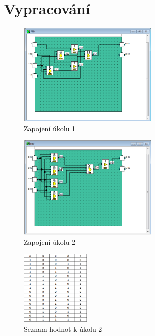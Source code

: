 \documentclass[a4paper]{article}
\begin{document}




\section*{Vypracování}
\begin{figure}[H]
	\centering
	\includegraphics[width=0.6\textwidth]{PLC_1.png}
	\caption{Zapojení úkolu 1}
	\label{fig:mesh1}
\end{figure}

\begin{figure}[H]
	\centering
	\includegraphics[width=0.6\textwidth]{PLC_2.png}
	\caption{Zapojení úkolu 2}
	\label{fig:mesh2}
\end{figure}

\begin{figure}[H]
	\centering
	\includegraphics[width=0.3\textwidth]{hodnoty1.png}
	\caption{Seznam hodnot k úkolu 2}
	\label{fig:hodnoty1}
\end{figure}
\end{document}
